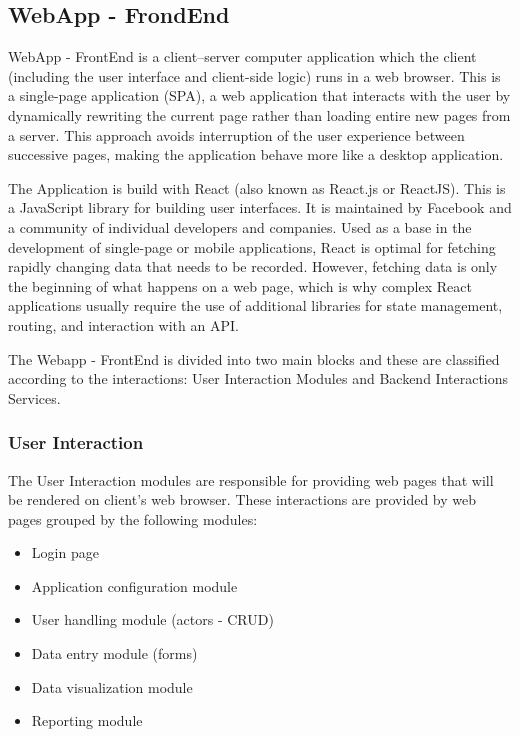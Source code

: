 \subsection{WebApp - FrondEnd}\label{sec:WebAppFrondEnd}
WebApp - FrontEnd is a client–server computer application which the client (including the user interface and client-side logic) runs in a web browser. This is a single-page application (SPA), a web application that interacts with the user by dynamically rewriting the current page rather than loading entire new pages from a server. This approach avoids interruption of the user experience between successive pages, making the application behave more like a desktop application.

The Application is build with React (also known as React.js or ReactJS). This is a JavaScript library for building user interfaces. It is maintained by Facebook and a community of individual developers and companies. Used as a base in the development of single-page or mobile applications, React is optimal for fetching rapidly changing data that needs to be recorded. However, fetching data is only the beginning of what happens on a web page, which is why complex React applications usually require the use of additional libraries for state management, routing, and interaction with an API.

The Webapp - FrontEnd is divided into two main blocks and these are classified according to the interactions: User Interaction Modules and Backend Interactions Services.

\subsubsection{User Interaction}\label{sec:UserInteraction}
The User Interaction modules are responsible for providing web pages that will be rendered on client’s web browser. These interactions are provided by web pages grouped by the following modules:

\begin{itemize}
\item Login page
\item Application configuration module
\item User handling module (actors - CRUD)
\item Data entry module (forms)
\item Data visualization module
\item Reporting module
\end{itemize}

